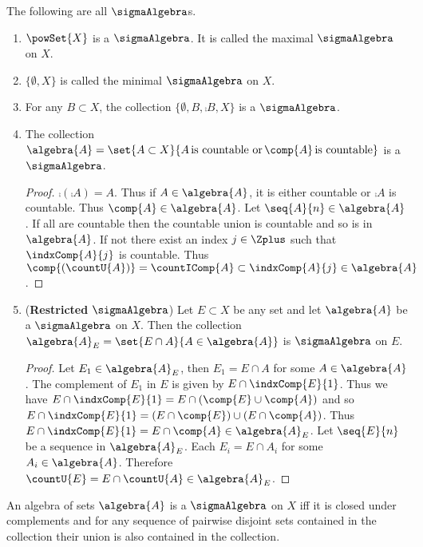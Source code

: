 \begin{Example}\label{ex:type_of_sigma_alg}
    The following are all $\sigmaAlgebra$s.
    \begin{enumerate}
	\item $\powSet{X}$ is a $\sigmaAlgebra$. It is called the maximal $\sigmaAlgebra$ on $X$.
	\item $\lbrace \emptyset, X \rbrace$ is called the minimal $\sigmaAlgebra$ on
	    $X$.
	\item For any $B \subset X$, the collection $\lbrace \emptyset, B, \comp{B}, X\rbrace$ is a
	    $\sigmaAlgebra$.
	\item The collection $\algebra{A} = \set{A \subset X}{A \, \text{is countable or} \,
	       	\comp{A}\,\text{is countable}}$ is a $\sigmaAlgebra$.
	    \begin{proof}
		$\comp{(\comp{A})} = A$. Thus if $A \in \algebra{A}$, it is either countable or
		$\comp{A}$ is countable. Thus $\comp{A} \in \algebra{A}$. Let $\seq{A}{n} \in
		\algebra{A}$. If all are countable then the countable union is countable and so is
		in $\algebra{A}$. If not there exist an index $j \in \Zplus$ such that
		$\indxComp{A}{j}$ is countable. Thus $\comp{(\countU{A})} = \countIComp{A} \subset
		\indxComp{A}{j} \in \algebra{A}$.
	    \end{proof}
	\item (\textbf{Restricted} $\sigmaAlgebra$)
	    Let $E \subset X$ be any set and let $\algebra{A}$ be a $\sigmaAlgebra$ on $X$. Then
	    the collection $\algebra{A}_{E} = \set{E \cap A}{A \in \algebra{A}}$ is $\sigmaAlgebra$
	    on $E$.
	    \begin{proof}
		Let $E_1 \in \algebra{A}_{E}$, then $E_1 = E \cap A$ for some $A \in \algebra{A}$.
		The complement of $E_1$ in $E$ is given by $E \cap \indxComp{E}{1}$. Thus we have $E
		\cap \indxComp{E}{1} = E \cap (\comp{E} \cup \comp{A})$ and so $E \cap \indxComp{E}{1} =
		(E \cap \comp{E}) \cup (E \cap \comp{A})$. Thus $E \cap \indxComp{E}{1} = E \cap
		\comp{A} \in \algebra{A}_{E}$. Let $\seq{E}{n}$ be a sequence in $\algebra{A}_{E}$.
		Each $E_i = E \cap A_i$ for some $A_i \in \algebra{A}$. Therefore $\countU{E} =
		E \cap \countU{A} \in \algebra{A}_{E}$.
	    \end{proof}
    \end{enumerate}
\end{Example}
\begin{Theorem}[name=Equivalent Characterization of $\sigmaAlgebra$]\label{thm:eq_ch_sigmaA}
    An algebra of sets $\algebra{A}$ is a $\sigmaAlgebra$ on $X$ iff it is closed under
    complements and for any sequence of pairwise disjoint sets contained in the collection 
    their union is also contained in the collection. 
\end{Theorem}
